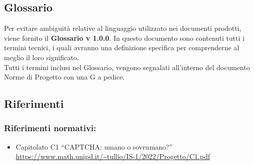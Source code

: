 \subsection{Glossario}
Per evitare ambiguità relative al linguaggio utilizzato nei documenti prodotti, viene fornito il \textbf{Glossario v 1.0.0}. In questo documento sono contenuti tutti i termini tecnici, i quali avranno una definizione specifica per comprenderne al meglio il loro significato.\\
Tutti i termini inclusi nel Glossario, vengono segnalati all'interno del documento Norme di Progetto con una G a pedice.

\subsection{Riferimenti}

\subsubsection{Riferimenti normativi:}\:
\begin{itemize}
	\item Capitolato C1 “CAPTCHA: umano o sovrumano?”
	\url{https://www.math.unipd.it/~tullio/IS-1/2022/Progetto/C1.pdf}
\end{itemize}


